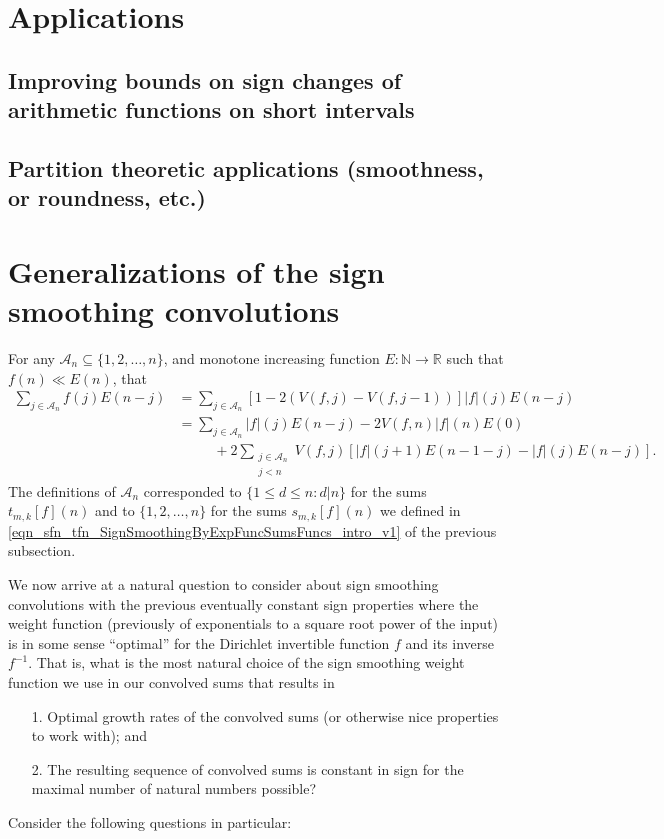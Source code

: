 \documentclass[11pt,reqno]{amsart}
\numberwithin{figure}{section}
\numberwithin{table}{section}
\theoremstyle{plain}
\numberwithin{theorem}{section}
\theoremstyle{definition}
\begin{document}
\section{Applications} 

\subsection{Improving bounds on sign changes of arithmetic functions on short intervals} 

\subsection{Partition theoretic applications (smoothness, or roundness, etc.)} 

\section{Generalizations of the sign smoothing convolutions} 

For any $\mathcal{A}_n \subseteq \{1,2,\ldots,n\}$, and monotone increasing function 
$E: \mathbb{N} \rightarrow \mathbb{R}$ such that $f(n) \ll E(n)$, that 
\begin{align*} 
\sum_{j \in \mathcal{A}_n} f(j) E(n-j) & = \sum_{j \in \mathcal{A}_n} \left[ 
     1-2(V(f, j)-V(f, j-1))\right] |f|(j) E(n-j) \\ 
     & = \sum_{j \in \mathcal{A}_n} |f|(j) E(n-j) - 2 V(f, n) |f|(n) E(0) \\ 
     & \phantom{=\quad\ } + 
     2 \sum_{\substack{j \in \mathcal{A}_n \\ j < n}} V(f, j) \left[ 
     |f|(j+1) E(n-1-j) - |f|(j) E(n-j) 
     \right]. 
\end{align*} 
The definitions of $\mathcal{A}_n$ corresponded to 
$\{1 \leq d \leq n: d|n\}$ for the sums $t_{m,k}[f](n)$ and to 
$\{1,2,\ldots,n\}$ for the sums $s_{m,k}[f](n)$ 
we defined in \eqref{eqn_sfn_tfn_SignSmoothingByExpFuncSumsFuncs_intro_v1} of the 
previous subsection. 

We now arrive at a natural question to consider 
about sign smoothing convolutions with the previous eventually constant sign properties 
where the weight function (previously of 
exponentials to a square root power of the input) is in some sense ``optimal'' for the 
Dirichlet invertible function $f$ and its inverse $f^{-1}$. 
That is, what is the most natural choice of the sign smoothing weight function we use in our convolved 
sums that results in 
\begin{itemize} 
\item[1.] Optimal growth rates of the convolved sums (or otherwise nice properties to 
work with); and 
\item[2.] The resulting sequence of convolved sums is constant in sign for the maximal number of 
natural numbers possible? 
\end{itemize} 
Consider the following questions in particular: 
\end{document}
